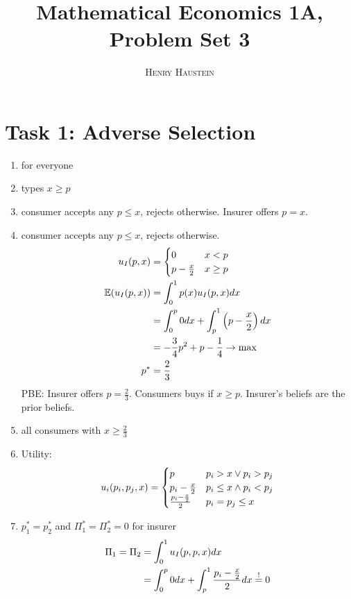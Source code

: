 \documentclass{article}
\title{\textbf{Mathematical Economics 1A, Problem Set 3}}
\author{\textsc{Henry Haustein}}
\date{}
\newcommand{\E}{\mathbb{E}}
\begin{document}
	\maketitle
	
	\section*{Task 1: Adverse Selection}
	\begin{enumerate}[label=(\alph*)]
		\item for everyone
		\item types $x\ge p$
		\item consumer accepts any $p\le x$, rejects otherwise. Insurer offers $p=x$.
		\item consumer accepts any $p\le x$, rejects otherwise.
		\begin{align}
			u_I(p,x) &= \begin{cases}
				0 & x<p \\
				p-\frac{x}{2} & x\ge p
			\end{cases} \notag \\
			\E(u_I(p,x)) &= \int_0^1 p(x)u_I(p,x)dx \notag \\
			&= \int_0^p 0 dx + \int_p^1 \left(p-\frac{x}{2}\right) dx \notag \\
			&= -\frac{3}{4}p^2 + p - \frac{1}{4} \to\max \notag \\
			p^\ast &= \frac{2}{3} \notag
		\end{align}
		PBE: Insurer offers $p=\frac{2}{3}$. Consumers buys if $x\ge p$. Insurer's beliefs are the prior beliefs.
		\item all consumers with $x\ge\frac{2}{3}$
		\item Utility:
		\begin{align}
			u_i(p_i,p_j,x) = \begin{cases}
				p & p_i>x \lor p_i>p_j \\
				p_i-\frac{x}{2} & p_i\le x\land p_i<p_j \\
				\frac{p_i - \frac{x}{2}}{2} & p_i=p_j \le x
			\end{cases} \notag
		\end{align}
		\item $p_1^\ast = p_2^\ast$ and $\Pi_1^\ast = \Pi_2^\ast = 0$ for insurer
		\begin{align}
			\Pi_1 = \Pi_2 &= \int_0^1 u_I(p,p,x) dx \notag \\
			&= \int_0^p 0dx + \int_p^1 \frac{p_i - \frac{x}{2}}{2} dx \overset{!}{=} 0 \notag \\

\end{align}
\end{enumerate}
\end{document}
